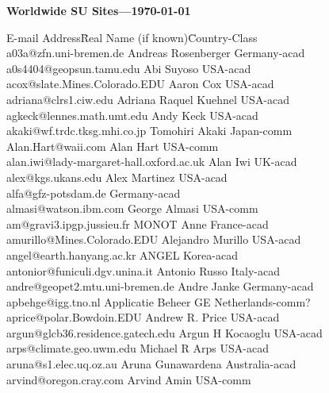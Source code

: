 
\centerline{\LARGE\bf Worldwide SU Sites---\today}
\vspace{1ex}
\begin{tabbing}
E-mail Address\hspace{4.75cm}\= Real Name (if known)\hspace{3.2cm}\= Country-Class\\

a03a@zfn.uni-bremen.de \> Andreas Rosenberger \> Germany-acad\\
a0s4404@geopsun.tamu.edu \> Abi Suyoso \> USA-acad\\
acox@slate.Mines.Colorado.EDU \> Aaron Cox \> USA-acad\\
adriana@clrs1.ciw.edu \> Adriana Raquel Kuehnel \> USA-acad\\
agkeck@lennes.math.umt.edu \> Andy Keck \> USA-acad\\
akaki@wf.trdc.tksg.mhi.co.jp \> Tomohiri Akaki \> Japan-comm\\
Alan.Hart@waii.com \> Alan Hart \> USA-comm\\
alan.iwi@lady-margaret-hall.oxford.ac.uk \> Alan Iwi \> UK-acad\\
alex@kgs.ukans.edu \> Alex Martinez \> USA-acad\\
alfa@gfz-potsdam.de \> \> Germany-acad\\
almasi@watson.ibm.com \> George Almasi \>  USA-comm\\
am@gravi3.ipgp.jussieu.fr \> MONOT Anne \> France-acad\\
amurillo@Mines.Colorado.EDU \> Alejandro Murillo \> USA-acad\\
angel@earth.hanyang.ac.kr \> ANGEL \> Korea-acad\\
antonior@funiculi.dgv.unina.it \> Antonio Russo \> Italy-acad\\
andre@geopet2.mtu.uni-bremen.de \> Andre Janke \> Germany-acad\\
apbehge@igg.tno.nl \> Applicatie Beheer GE \> Netherlands-comm?\\
aprice@polar.Bowdoin.EDU \> Andrew R. Price \> USA-acad\\
argun@glcb36.residence.gatech.edu \> Argun H Kocaoglu \> USA-acad\\
arps@climate.geo.uwm.edu \> Michael R Arps \> USA-acad\\
aruna@s1.elec.uq.oz.au \> Aruna Gunawardena \> Australia-acad\\
arvind@oregon.cray.com \> Arvind Amin \> USA-comm\\

\end{tabbing}
